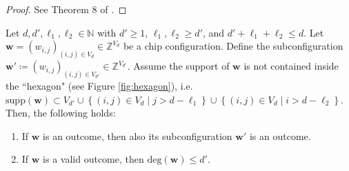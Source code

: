 \begin{proof}
    See Theorem 8 of \cite{grinberghyperfactorial}.
\end{proof}


\begin{proposition}\label{prop:hexagon-criterion231312}
    Let \( d, d', \ell_1, \ell_2 \in \mathbb{N} \) with \( d' \geq 1 \), \( \ell_1, \ell_2 \geq d' \), and \( d' + \ell_1 + \ell_2 \leq d \). Let \( \mathbf{w} = (w_{i,j})_{(i,j) \in V_d} \in \mathbb{Z}^{V_d} \) be a chip configuration. Define the subconfiguration \( \mathbf{w}' \coloneqq (w_{i,j})_{(i,j) \in V_{d'}} \in \mathbb{Z}^{V_{d'}}\). Assume the support of \( \mathbf{w} \) is not contained inside the ``hexagon" (see Figure \ref{fig:hexagon}), i.e. \( \mathrm{supp}(\mathbf{w}) \subset V_{d'}  \cup \left\{ (i,j) \in V_d \mid j > d - \ell_1 \right\} \cup \left\{ (i,j) \in V_d \mid i > d - \ell_2 \right\} \).
    Then, the following holds:
    \begin{enumerate}
        \item If \( \mathbf{w} \) is an outcome, then also its subconfiguration \( \mathbf{w}' \) is an outcome.
        \item If \( \mathbf{w} \) is a valid outcome, then \( \mathrm{deg}(\mathbf{w}) \leq d' \).
    \end{enumerate}
\end{proposition}

